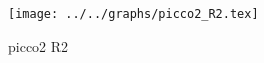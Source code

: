 \begin{figure}[h] \centering\texttt{[image: ../../graphs/picco2\_R2.tex]}\caption{picco2 R2}\label{gr:picco2_R2} \end{figure}
